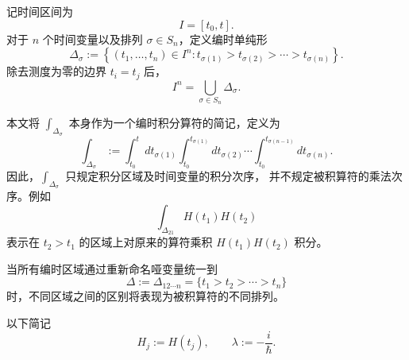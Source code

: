 \documentclass[UTF8,a4paper,11pt,openany]{ctexbook}
\begin{document}
\begin{definition}[编时单纯形与编时积分记号]
记时间区间为
\[
I=[t_0,t].
\]
对于 $n$ 个时间变量以及排列 $\sigma\in S_n$，定义编时单纯形
\begin{equation}
    \Delta_\sigma
    :=
    \left\{
        (t_1,\ldots,t_n)\in I^n:
        t_{\sigma(1)}>
        t_{\sigma(2)}>
        \cdots>
        t_{\sigma(n)}
    \right\}.
\end{equation}
除去测度为零的边界 $t_i=t_j$ 后，
\[
I^n
=
\bigcup_{\sigma\in S_n}\Delta_\sigma.
\]

本文将 $\int_{\Delta_\sigma}$ 本身作为一个编时积分算符的简记，定义为
\begin{equation}
    \int_{\Delta_\sigma}
    :=
    \int_{t_0}^{t}dt_{\sigma(1)}
    \int_{t_0}^{t_{\sigma(1)}}dt_{\sigma(2)}
    \cdots
    \int_{t_0}^{t_{\sigma(n-1)}}dt_{\sigma(n)}.
\end{equation}
因此，$\int_{\Delta_\sigma}$ 只规定积分区域及时间变量的积分次序，
并不规定被积算符的乘法次序。例如
\[
\int_{\Delta_{21}}H(t_1)H(t_2)
\]
表示在 $t_2>t_1$ 的区域上对原来的算符乘积
$H(t_1)H(t_2)$ 积分。

当所有编时区域通过重新命名哑变量统一到
\[
\Delta:=\Delta_{12\cdots n}
=
\{t_1>t_2>\cdots>t_n\}
\]
时，不同区域之间的区别将表现为被积算符的不同排列。
\end{definition}

以下简记
\[
H_j:=H(t_j),
\qquad
\lambda:=-\frac{i}{\hbar}.
\]
\end{document}
